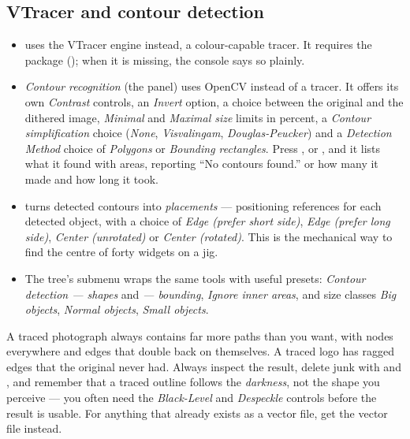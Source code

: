 \subsection*{VTracer and contour detection}

\begin{itemize}
  \item {} uses the VTracer engine instead, a
        colour-capable tracer. It requires the  package
        (); when it is missing, the console says so
        plainly.
  \item \emph{Contour recognition} (the  panel) uses
        OpenCV instead of a tracer. It offers its own \emph{Contrast} controls, an
        \emph{Invert} option, a choice between the original and the dithered
        image, \emph{Minimal} and \emph{Maximal size} limits in percent, a
        \emph{Contour simplification} choice (\emph{None}, \emph{Visvalingam},
        \emph{Douglas-Peucker}) and a \emph{Detection Method} choice of
        \emph{Polygons} or \emph{Bounding rectangles}. Press ,  or , and it lists what it
        found with areas, reporting ``No contours found.'' or how many it made and
        how long it took.
  \item {} turns detected contours into \emph{placements}
        --- positioning references for each detected object, with a choice of
        \emph{Edge (prefer short side)}, \emph{Edge (prefer long side)},
        \emph{Center (unrotated)} or \emph{Center (rotated)}. This is the
        mechanical way to find the centre of forty widgets on a jig.
  \item The tree's  submenu wraps the same tools with useful
        presets: \emph{Contour detection --- shapes} and \emph{--- bounding},
        \emph{Ignore inner areas}, and size classes \emph{Big objects},
        \emph{Normal objects}, \emph{Small objects}.
\end{itemize}

\begin{warnbox}
A traced photograph always contains far more paths than you want, with nodes
everywhere and edges that double back on themselves. A traced logo has ragged
edges that the original never had. Always inspect the result, delete junk with
 and , and remember that a
traced outline follows the \emph{darkness}, not the shape you perceive --- you
often need the \emph{Black-Level} and \emph{Despeckle} controls before the result
is usable. For anything that already exists as a vector file, get the vector file
instead.
\end{warnbox}

